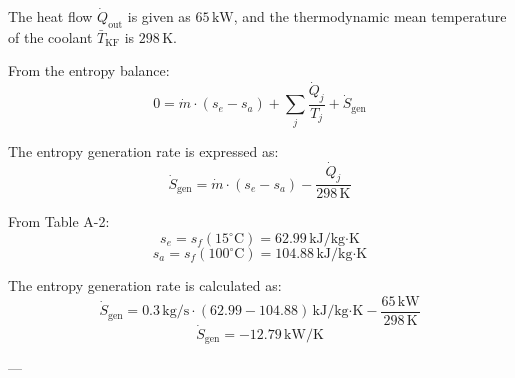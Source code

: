 The heat flow \( \dot{Q}_{\text{out}} \) is given as \( 65 \, \text{kW} \), and the thermodynamic mean temperature of the coolant \( \bar{T}_{\text{KF}} \) is \( 298 \, \text{K} \).  

From the entropy balance:  
\[
0 = \dot{m} \cdot (s_e - s_a) + \sum_j \frac{\dot{Q}_j}{T_j} + \dot{S}_{\text{gen}}
\]  

The entropy generation rate is expressed as:  
\[
\dot{S}_{\text{gen}} = \dot{m} \cdot (s_e - s_a) - \frac{\dot{Q}_j}{298 \, \text{K}}
\]  

From Table A-2:  
\[
s_e = s_f(15^\circ\text{C}) = 62.99 \, \text{kJ/kg·K}
\]  
\[
s_a = s_f(100^\circ\text{C}) = 104.88 \, \text{kJ/kg·K}
\]  

The entropy generation rate is calculated as:  
\[
\dot{S}_{\text{gen}} = 0.3 \, \text{kg/s} \cdot (62.99 - 104.88) \, \text{kJ/kg·K} - \frac{65 \, \text{kW}}{298 \, \text{K}}
\]  
\[
\dot{S}_{\text{gen}} = -12.79 \, \text{kW/K}
\]  

---